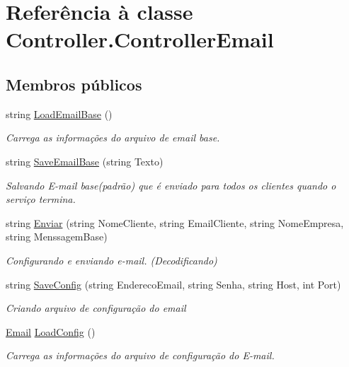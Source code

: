 \hypertarget{class_controller_1_1_controller_email}{}\section{Referência à classe Controller.\+Controller\+Email}
\label{class_controller_1_1_controller_email}
\subsection*{Membros públicos}
\begin{DoxyCompactItemize}
\item 
string \hyperlink{class_controller_1_1_controller_email_aba9e68104660bfbcf3a2caa6eb48f8a6}{Load\+Email\+Base} ()
\begin{DoxyCompactList}\small\item\em Carrega as informações do arquivo de email base. \end{DoxyCompactList}\item 
string \hyperlink{class_controller_1_1_controller_email_ae385f232504c37cf399bebb18eec5db4}{Save\+Email\+Base} (string Texto)
\begin{DoxyCompactList}\small\item\em Salvando E-\/mail base(padrão) que é enviado para todos os clientes quando o serviço termina. \end{DoxyCompactList}\item 
string \hyperlink{class_controller_1_1_controller_email_a217fd55ecff35c4f8650490c70f1e4ef}{Enviar} (string Nome\+Cliente, string Email\+Cliente, string Nome\+Empresa, string Menssagem\+Base)
\begin{DoxyCompactList}\small\item\em Configurando e enviando e-\/mail. (Decodificando) \end{DoxyCompactList}\item 
string \hyperlink{class_controller_1_1_controller_email_a2828b4061bb034bc569fc0f2418078b0}{Save\+Config} (string Endereco\+Email, string Senha, string Host, int Port)
\begin{DoxyCompactList}\small\item\em Criando arquivo de configuração do email \end{DoxyCompactList}\item 
\hyperlink{class_model_1_1_email}{Email} \hyperlink{class_controller_1_1_controller_email_ab776dc8eeaf2b91f2f9b13b38b312f28}{Load\+Config} ()
\begin{DoxyCompactList}\small\item\em Carrega as informações do arquivo de configuração do E-\/mail. \end{DoxyCompactList}\item 

\end{DoxyCompactItemize}
